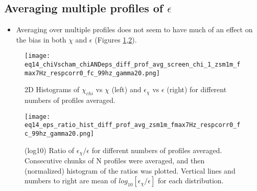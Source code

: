 \documentclass[11pt]{article}
\begin{document}
\clearpage
\subsection{Averaging multiple profiles of $\epsilon$}


\begin{itemize}

\item Averaging over multiple profiles does not seem to have much of an effect on the bias in both $\chi$ and $\epsilon$ (Figures \ref{2Dhistdiffprof},\ref{histdiffprof}).


\end{itemize}




\begin{figure}[htbp]
\texttt{[image: eq14\_chiVscham\_chiANDeps\_diff\_prof\_avg\_screen\_chi\_1\_zsm1m\_fmax7Hz\_respcorr0\_fc\_99hz\_gamma20.png]}
\caption{2D Histograms of $\chi_{chi}$ vs $\chi$ (left) and $\epsilon_{\chi}$ vs $\epsilon$ (right) for different numbers of profiles averaged. }
\label{2Dhistdiffprof}
\end{figure}


\begin{figure}[htbp]
\texttt{[image: eq14\_eps\_ratio\_hist\_diff\_prof\_avg\_zsm1m\_fmax7Hz\_respcorr0\_fc\_99hz\_gamma20.png]}
\caption{(log10) Ratio of $\epsilon_{\chi}/\epsilon$ for different numbers of profiles averaged. Consecutive chunks of N profiles were averaged, and then (normalized) histogram of the ratios was plotted. Vertical lines and numbers to right are mean of $log_{10}[\epsilon_{\chi}/\epsilon]$ for each distribution. }
\label{histdiffprof}
\end{figure}


\end{document}
